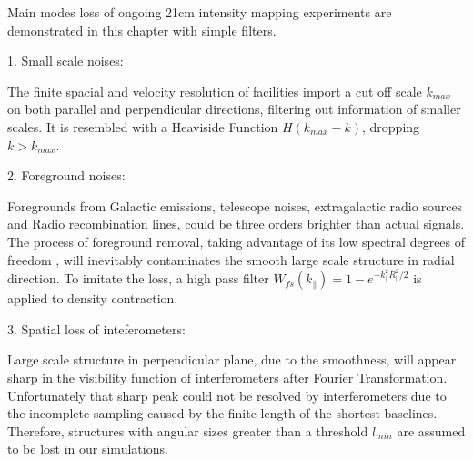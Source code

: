 Main modes loss of ongoing 21cm intensity mapping 
experiments are demonstrated in this chapter with simple filters. 

1. Small scale noises:

The finite spacial and velocity resolution of facilities 
import a cut off scale $k_{max}$ on both parallel and perpendicular 
directions, filtering out information of smaller scales. 
It is resembled with a Heaviside Function 
$H(k_{max}-k)$, dropping $k>k_{max}$. 

2. Foreground noises:

Foregrounds from Galactic emissions, telescope noises, 
extragalactic radio sources and Radio recombination lines, 
could be three orders brighter than actual signals\cite{DiMatteo04,Masui13}. 
The process of foreground removal, taking advantage of its low spectral
degrees of freedom \cite{Switzer15}, 
will inevitably contaminates the smooth large scale structure in radial direction.  
To imitate the loss, a high pass filter $W_{fs}(k_\parallel)=1-e^{-k_\parallel^2R_\parallel^2/2}$ is applied to density contraction. 

3. Spatial loss of inteferometers:

Large scale structure in perpendicular plane, due to the smoothness, 
will appear sharp in the visibility function of interferometers 
after Fourier Transformation. 
Unfortunately that sharp peak could not be resolved by interferometers 
due to the incomplete sampling  
caused by the finite length of the shortest baselines. 
Therefore, structures with angular sizes greater than a threshold $l_{min}$ 
are assumed to be lost in our simulations. 

